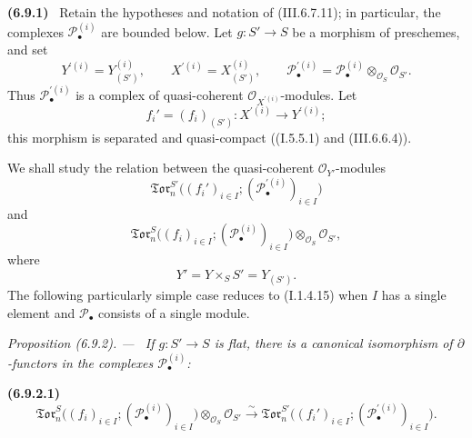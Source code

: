 \documentclass[10pt,oneside]{book}
\newcommand{\sh}[1]{\mathscr{#1}}
\newcommand{\sref}[2][]{(#2)}
\newenvironment{env}[1][]{\par\medskip\noindent\textbf{(#1)}\ }{\par}
\newenvironment{proposition}[1][]{\par\medskip\noindent\itshape Proposition (#1). ---\ }{\par}
\begin{document}
\begin{env}[6.9.1]
\label{III.6.9.1}
Retain the hypotheses and notation of \sref{III.6.7.11}; in
particular, the complexes $\sh P_\bullet^{(i)}$ are bounded below.
Let $g:S'\to S$ be a morphism of preschemes, and set
\[
  Y^{\prime(i)}=Y_{(S')}^{(i)},
  \qquad
  X^{\prime(i)}=X_{(S')}^{(i)},
  \qquad
  \sh P_\bullet^{\prime(i)}
  =
  \sh P_\bullet^{(i)}
  \otimes_{\sh O_S}\sh O_{S'}.
\]
Thus $\sh P_\bullet^{\prime(i)}$ is a complex of quasi-coherent
$\sh O_{X^{\prime(i)}}$-modules.  Let
\[
  f_i'=(f_i)_{(S')}:
  X^{\prime(i)}\longrightarrow Y^{\prime(i)};
\]
this morphism is separated and quasi-compact
(\sref[I]{I.5.5.1} and \sref{III.6.6.4}).

We shall study the relation between the quasi-coherent
$\sh O_{Y'}$-modules
\[
  \mathfrak{Tor}_n^{S'}
  \bigl(
    (f_i')_{i\in I};
    (\sh P_\bullet^{\prime(i)})_{i\in I}
  \bigr)
\]
and
\[
  \mathfrak{Tor}_n^S
  \bigl(
    (f_i)_{i\in I};
    (\sh P_\bullet^{(i)})_{i\in I}
  \bigr)
  \otimes_{\sh O_S}\sh O_{S'},
\]
where
\[
  Y'=Y\times_SS'=Y_{(S')}.
\]
The following particularly simple case reduces to
\sref[I]{I.1.4.15} when $I$ has a single element and
$\sh P_\bullet$ consists of a single module.
\end{env}

\begin{proposition}[6.9.2]
\label{III.6.9.2}
If $g:S'\to S$ is flat, there is a canonical isomorphism of
$\partial$-functors in the complexes $\sh P_\bullet^{(i)}$:
\begin{env}[6.9.2.1]
\label{III.6.9.2.1}
\[
  \mathfrak{Tor}_n^S
  \bigl(
    (f_i)_{i\in I};
    (\sh P_\bullet^{(i)})_{i\in I}
  \bigr)
  \otimes_{\sh O_S}\sh O_{S'}
  \xrightarrow{\sim}
  \mathfrak{Tor}_n^{S'}
  \bigl(
    (f_i')_{i\in I};
    (\sh P_\bullet^{\prime(i)})_{i\in I}
  \bigr).
  \tag{6.9.2.1}\label{III.6.9.2.1.eq}
\]
\end{env}
\end{proposition}
\end{document}
